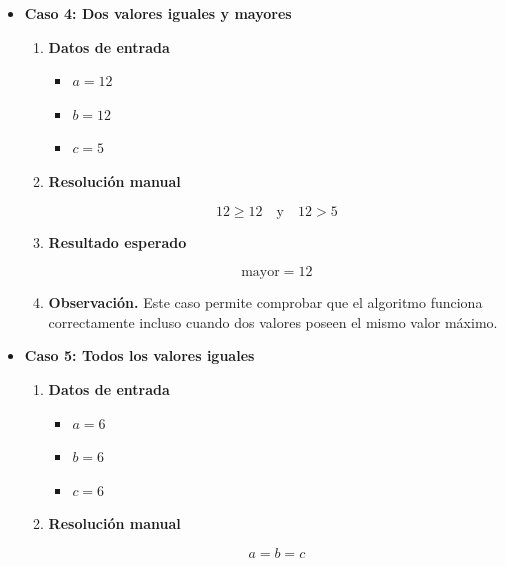 \documentclass[12pt,twoside]{book}
\begin{document}
\begin{itemize}
							\item \textbf{Caso 4: Dos valores iguales y mayores}
							
							\begin{enumerate}
								
								\item \textbf{Datos de entrada}
								
								\begin{itemize}
									\item $a = 12$
									\item $b = 12$
									\item $c = 5$
								\end{itemize}
								
								\item \textbf{Resolución manual}
								
								\[
								12 \ge 12 \quad \text{y} \quad 12 > 5
								\]
								
								\item \textbf{Resultado esperado}
								
								\[
								\text{mayor} = 12
								\]
								
								\item \textbf{Observación.}  
								Este caso permite comprobar que el algoritmo funciona correctamente incluso cuando dos valores poseen el mismo valor máximo.
								
							\end{enumerate}
							
							
							\item \textbf{Caso 5: Todos los valores iguales}
							
							\begin{enumerate}
								
								\item \textbf{Datos de entrada}
								
								\begin{itemize}
									\item $a = 6$
									\item $b = 6$
									\item $c = 6$
								\end{itemize}
								
								\item \textbf{Resolución manual}
								
								\[
								a = b = c
								\]
								

\end{enumerate}
\end{itemize}
\end{document}
